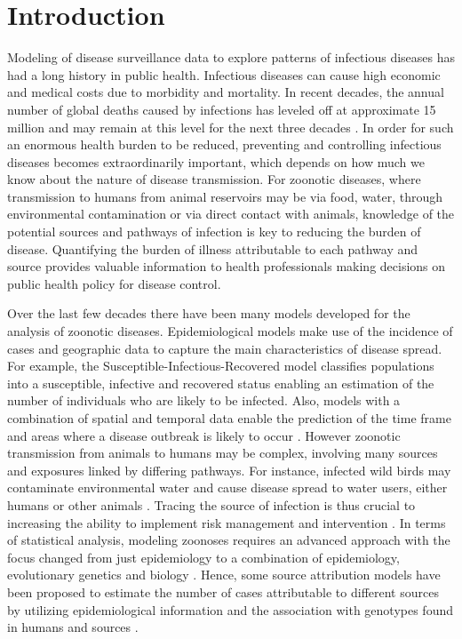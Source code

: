 \documentclass[times, doublespace]{simauth}%
\begin{document}
\section{Introduction}
Modeling of disease surveillance data to explore patterns of infectious diseases has had a long history in public health. Infectious diseases can cause high economic and medical costs due to morbidity and mortality. In recent decades, the annual number of global deaths caused by infections has leveled off at approximate 15 million and may remain at this level for the next three decades \cite{DyeC, WHOM}. In order for such an enormous health burden to be reduced, preventing and controlling infectious diseases becomes extraordinarily important, which depends on how much we know about the nature of disease transmission. For zoonotic diseases, where transmission to humans from animal reservoirs may be via food, water, through environmental contamination or via direct contact with animals, knowledge of the potential sources and pathways of infection is key to reducing the burden of disease. Quantifying the burden of illness attributable to each pathway and source provides valuable information to health professionals making decisions on public health policy for disease control. 

Over the last few decades there have been many models developed for the analysis of zoonotic diseases. Epidemiological models make use of the incidence of cases and geographic data to capture the main characteristics of disease spread. For example, the Susceptible-Infectious-Recovered model \cite{Kerm} classifies populations into a susceptible, infective and recovered status enabling an estimation of the number of individuals who are likely to be infected. Also, models with a combination of spatial and temporal data enable the prediction of the time frame and areas where a disease outbreak is likely to occur \cite{HeldL, Hoehl, Simo}. However zoonotic transmission from animals to humans may be complex, involving many sources and exposures linked by differing pathways. For instance, infected wild birds may contaminate environmental water and cause disease spread to water users, either humans or other animals \cite{Wagen}. Tracing the source of infection is thus crucial to increasing the ability to implement risk management and intervention \cite{Wilso, Morel}. In terms of statistical analysis, modeling zoonoses requires an advanced approach with the focus changed from just epidemiology to a combination of epidemiology, evolutionary genetics and biology \cite{Muell}. Hence, some source attribution models have been proposed to estimate the number of cases attributable to different sources by utilizing epidemiological information and the association with genotypes found in humans and sources \cite{vanP, Hald, MullA}. 
\end{document}
